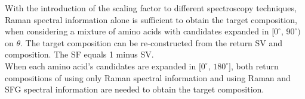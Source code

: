 With the introduction of the scaling factor to different spectroscopy techniques, Raman spectral information alone is sufficient to obtain the target composition, when considering a mixture of amino acids with candidates expanded in $[0^{\circ}$, $90^{\circ})$ on $\theta$. The target composition can be re-constructed from the return SV and composition. The SF equals 1 minus SV. \\

When each amino acid's candidates are expanded in $[0^{\circ}$, $180^{\circ}]$, both return compositions of using only Raman spectral information and using Raman and SFG spectral information are needed to obtain the target composition.  \\
